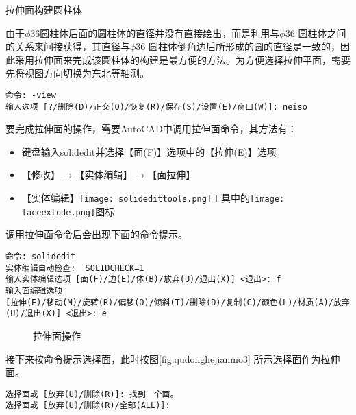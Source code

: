 \begin{procedure}
\item 拉伸面构建圆柱体


由于$\phi 36$圆柱体后面的圆柱体的直径并没有直接绘出，而是利用与$\phi 36$ 圆柱体之间的关系来间接获得，其直径与$\phi 36$ 圆柱体倒角边后所形成的圆的直径是一致的，因此采用拉伸面来完成该圆柱体的构建是最方便的方法。为方便选择拉伸平面，需要先将视图方向切换为东北等轴测。

\begin{lstlisting}
命令: -view 
输入选项 [?/删除(D)/正交(O)/恢复(R)/保存(S)/设置(E)/窗口(W)]: neiso
\end{lstlisting}


要完成拉伸面的操作，需要AutoCAD中调用拉伸面命令，其方法有：
\begin{itemize}
	\item 键盘输入solidedit并选择【面(F)】选项中的【拉伸(E)】选项
	\item 【修改】$\rightarrow$【实体编辑】$\rightarrow$【面拉伸】
	\item 【实体编辑】\texttt{[image: solidedittools.png]}工具中的\texttt{[image: faceextude.png]}图标	
\end{itemize}

调用拉伸面命令后会出现下面的命令提示。

\begin{lstlisting}
命令: solidedit
实体编辑自动检查:  SOLIDCHECK=1
输入实体编辑选项 [面(F)/边(E)/体(B)/放弃(U)/退出(X)] <退出>: f
输入面编辑选项
[拉伸(E)/移动(M)/旋转(R)/偏移(O)/倾斜(T)/删除(D)/复制(C)/颜色(L)/材质(A)/放弃(U)/退出(X)] <退出>: e
\end{lstlisting}

\begin{figure}[htbp]
\centering
{}\hspace{60pt}
\caption{拉伸面操作}%
\end{figure}

接下来按命令提示选择面，此时按图\ref{fig:qudonghejianmo3} 所示选择面作为拉伸面。

\begin{lstlisting}
选择面或 [放弃(U)/删除(R)]: 找到一个面。
选择面或 [放弃(U)/删除(R)/全部(ALL)]:
\end{lstlisting}


\end{procedure}
